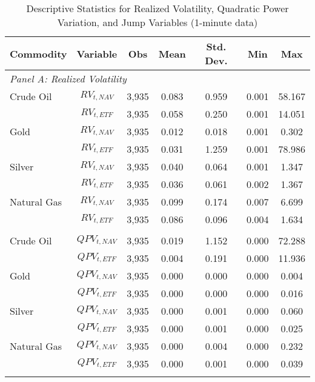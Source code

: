 \begin{table}[htbp]
\centering
\caption{Descriptive Statistics for Realized Volatility, Quadratic Power Variation, and Jump Variables (1-minute data)}
\label{tab:desc_stats_1min}
\begin{threeparttable}
\begin{tabular}{@{}lcccccc@{}}
\toprule
\multicolumn{1}{l}{Commodity} & Variable & Obs & Mean & Std. Dev. & Min & Max \\
\midrule
\multicolumn{7}{l}{\textit{Panel A: Realized Volatility}} \\
\addlinespace[0.1cm]
Crude Oil & $RV_{t,NAV}$ & 3,935 & 0.083 & 0.959 & 0.001 & 58.167 \\
          & $RV_{t,ETF}$ & 3,935 & 0.058 & 0.250 & 0.001 & 14.051 \\
\addlinespace[0.05cm]
Gold      & $RV_{t,NAV}$ & 3,935 & 0.012 & 0.018 & 0.001 & 0.302 \\
          & $RV_{t,ETF}$ & 3,935 & 0.031 & 1.259 & 0.001 & 78.986 \\
\addlinespace[0.05cm]
Silver    & $RV_{t,NAV}$ & 3,935 & 0.040 & 0.064 & 0.001 & 1.347 \\
          & $RV_{t,ETF}$ & 3,935 & 0.036 & 0.061 & 0.002 & 1.367 \\
\addlinespace[0.05cm]
Natural Gas & $RV_{t,NAV}$ & 3,935 & 0.099 & 0.174 & 0.007 & 6.699 \\
            & $RV_{t,ETF}$ & 3,935 & 0.086 & 0.096 & 0.004 & 1.634 \\
\addlinespace[0.2cm]

\multicolumn{7}{l}{\textit{Panel B: Quadratic Power Variation}} \\
\addlinespace[0.1cm]
Crude Oil & $QPV_{t,NAV}$ & 3,935 & 0.019 & 1.152 & 0.000 & 72.288 \\
          & $QPV_{t,ETF}$ & 3,935 & 0.004 & 0.191 & 0.000 & 11.936 \\
\addlinespace[0.05cm]
Gold      & $QPV_{t,NAV}$ & 3,935 & 0.000 & 0.000 & 0.000 & 0.004 \\
          & $QPV_{t,ETF}$ & 3,935 & 0.000 & 0.000 & 0.000 & 0.016 \\
\addlinespace[0.05cm]
Silver    & $QPV_{t,NAV}$ & 3,935 & 0.000 & 0.001 & 0.000 & 0.060 \\
          & $QPV_{t,ETF}$ & 3,935 & 0.000 & 0.001 & 0.000 & 0.025 \\
\addlinespace[0.05cm]
Natural Gas & $QPV_{t,NAV}$ & 3,935 & 0.000 & 0.004 & 0.000 & 0.232 \\
            & $QPV_{t,ETF}$ & 3,935 & 0.000 & 0.001 & 0.000 & 0.039 \\
\addlinespace[0.2cm]


\end{tabular}
\end{threeparttable}
\end{table}
